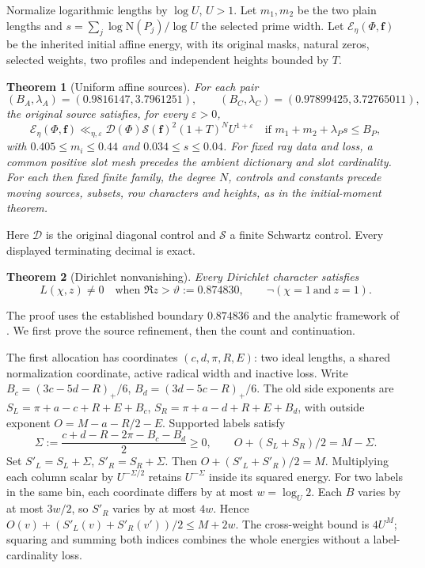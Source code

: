 \documentclass[10pt,a4paper]{article}
\newcommand{\tht}{\vartheta}
\newtheorem{theorem}{Theorem}
\begin{document}
Normalize logarithmic lengths by $\log U$, $U>1$. Let $m_1,m_2$ be the
two plain lengths and $s=\sum_j\log\mathrm N(P_j)/\log U$ the selected
prime width. Let $\mathcal E_\eta(\Phi,\mathbf f)$ be the inherited
initial affine energy, with its original masks, natural zeros, selected
weights, two profiles and independent heights bounded by $T$.
\begin{theorem}[Uniform affine sources]\label{thm:moment}
For each pair
\[
 (B_A,\lambda_A)=(0.9816147,3.7961251),\qquad
 (B_C,\lambda_C)=(0.97899425,3.72765011),
\]
the original source satisfies, for every $\varepsilon>0$,
\begin{equation}\label{eq:moment}
 \mathcal E_\eta(\Phi,\mathbf f)\ll_{\eta,\varepsilon}
 \mathcal D(\Phi)\mathcal S(\mathbf f)^2(1+T)^N U^{1+\varepsilon}
 \quad\text{if }m_1+m_2+\lambda_Ps\le B_P,
\end{equation}
with $0.405\le m_i\le0.44$ and $0.034\le s\le0.04$.
For fixed ray data and loss, a common positive slot mesh precedes the
ambient dictionary and slot cardinality. For each then fixed finite
family, the degree $N$, controls and constants precede moving sources,
subsets, row characters and heights, as in the initial-moment theorem.
\end{theorem}
Here $\mathcal D$ is the original diagonal control and $\mathcal S$ a
finite Schwartz control. Every displayed terminating decimal is exact.
\begin{theorem}[Dirichlet nonvanishing]\label{thm:main}
Every Dirichlet character satisfies
\[
 L(\chi,z)\ne0\quad\text{when }\Re z>\tht:=0.874830,
 \qquad\neg(\chi=1\ \text{and}\ z=1).
\]
\end{theorem}
The proof uses the established boundary $0.874836$ \cite{incumbent}
and the analytic framework of \cite{openai,collet,levy,asymmetric,detector}.
We first prove the source refinement, then the count and continuation.

The first allocation has coordinates $(c,d,\pi,R,E)$: two ideal lengths,
a shared normalization coordinate, active radical width and inactive
loss. Write $B_c=(3c-5d-R)_+/6$, $B_d=(3d-5c-R)_+/6$. The old side
exponents are $S_L=\pi+a-c+R+E+B_c$, $S_R=\pi+a-d+R+E+B_d$, with
outside exponent $O=M-a-R/2-E$. Supported labels satisfy
\begin{equation}\label{eq:balance}
 \Sigma:=\frac{c+d-R-2\pi-B_c-B_d}{2}\ge0,
 \qquad O+(S_L+S_R)/2=M-\Sigma.
\end{equation}
Set $S'_L=S_L+\Sigma$, $S'_R=S_R+\Sigma$. Then
$O+(S'_L+S'_R)/2=M$. Multiplying each column scalar by
$U^{-\Sigma/2}$ retains $U^{-\Sigma}$ inside its squared energy.
For two labels in the same bin, each coordinate differs by at most
$w=\log_U2$. Each $B$ varies by at most $3w/2$, so $S'_R$ varies by
at most $4w$. Hence
$O(v)+(S'_L(v)+S'_R(v'))/2\le M+2w$.
The cross-weight bound is $4U^M$; squaring and summing both indices
combines the whole energies without a label-cardinality loss.
\end{document}
